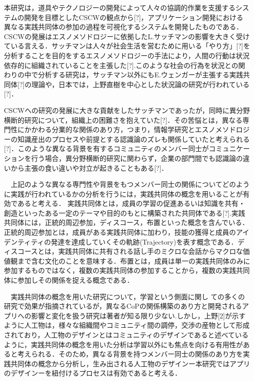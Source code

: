 \documentclass[submit,techrep]{ipsj}
\begin{document}
本研究は，道具やテクノロジーの開発によって人々の協調的作業を支援するシステムの開発を目標としたCSCWの観点から[?]，アプリケーション開発における異なる実践共同体の参加の過程を可視化するシステムを開発したものである．CSCWの発展はエスノメソドロジーに依拠したL.サッチマンの影響を大きく受けている言える．サッチマンは人々が社会生活を営むために用いる「やり方」[?]を分析することを目的をするエスノメソドロジーの手法により，人間の行動は状況依存的に組織されていることを主張した[?].このような社会の行為を状況との関わりの中で分析する研究は，サッチマン以外にもE.ウェンガーが主張する実践共同体[?]の理論や，日本では，上野直樹を中心とした状況論の研究が行われている[?]．

CSCWへの研究の発展に大きな貢献をしたサッチマンであったが，同時に異分野横断的研究について，組織上の困難さを抱えていた[?]．その苦悩とは，異なる専門性にかかわる分業的な関係のあり方，つまり，情報学研究とエスノメソドロジーの知識産出のプロセスや前提とする認識論のズレも関係していたと考えられる[?]．このような異なる背景を有するコミュニティのメンバー同士がコミュニケーションを行う場合，異分野横断的研究に関わらず，企業の部門間でも認識論の違いから主張の食い違いや対立が起きることもある[?]．

　上記のような異なる専門性や背景をもつメンバー同士の関係についてどのように実践が行われているかの分析を行うには，実践共同体の概念を用いることが有効であると考える．
実践共同体とは，成員の学習の促進あるいは知識を共有・創造といったある一定のテーマや目的のもとに構築された共同体である[?].実践共同体には，正統的周辺参加，ディスコース，布置といった概念を含んでいる．正統的周辺参加とは，成員がある実践共同体に加わり，技能の獲得と成員のアイデンティティの発達を達成していくその軌跡(Trajectory)を表す概念である．ディスコースとは，実践共同体に共有される話し手のミクロな会話からマクロな価値観まで含む文化のことを意味する．布置とは，成員は単一の実践共同体のみに参加するものではなく，複数の実践共同体の参加することから，複数の実践共同体に参加しその関係を捉える概念である．

　実践共同体の概念を用いた研究について，学習という側面に関し ての多くの研究で効果が指摘されているが，異なるCoPの関係構築のあり方と開発されるアプリへの影響と変化を扱う研究は著者が知る限り少ない.しかし，上野[2]が示すように人工物は，様々な組織間やコミュニティ間の調停，交渉の産物として形成されており，人工物のデザインとはコミュニティのデザインであると述べているように，実践共同体の概念を用いた分析は学習以外にも焦点を向ける有用性があると考えられる．そのため，異なる背景を持つメンバー同士の関係のあり方を実践共同体の概念から分析し，生み出される人工物のデザインー本研究ではアプリのデザインーを紐付けるプロセスは有効であると考える．
\end{document}
